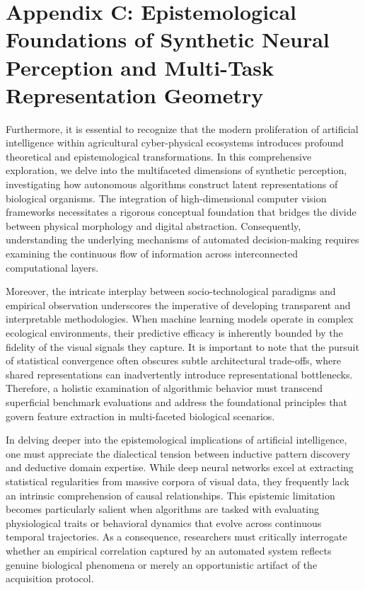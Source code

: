 \documentclass[Times,12pt,oneside,openany,print,index]{report}
\begin{document}
\chapter*{Appendix C: Epistemological Foundations of Synthetic Neural Perception and Multi-Task Representation Geometry}

Furthermore, it is essential to recognize that the modern proliferation of artificial intelligence within agricultural cyber-physical ecosystems introduces profound theoretical and epistemological transformations. In this comprehensive exploration, we delve into the multifaceted dimensions of synthetic perception, investigating how autonomous algorithms construct latent representations of biological organisms. The integration of high-dimensional computer vision frameworks necessitates a rigorous conceptual foundation that bridges the divide between physical morphology and digital abstraction. Consequently, understanding the underlying mechanisms of automated decision-making requires examining the continuous flow of information across interconnected computational layers.

Moreover, the intricate interplay between socio-technological paradigms and empirical observation underscores the imperative of developing transparent and interpretable methodologies. When machine learning models operate in complex ecological environments, their predictive efficacy is inherently bounded by the fidelity of the visual signals they capture. It is important to note that the pursuit of statistical convergence often obscures subtle architectural trade-offs, where shared representations can inadvertently introduce representational bottlenecks. Therefore, a holistic examination of algorithmic behavior must transcend superficial benchmark evaluations and address the foundational principles that govern feature extraction in multi-faceted biological scenarios.

In delving deeper into the epistemological implications of artificial intelligence, one must appreciate the dialectical tension between inductive pattern discovery and deductive domain expertise. While deep neural networks excel at extracting statistical regularities from massive corpora of visual data, they frequently lack an intrinsic comprehension of causal relationships. This epistemic limitation becomes particularly salient when algorithms are tasked with evaluating physiological traits or behavioral dynamics that evolve across continuous temporal trajectories. As a consequence, researchers must critically interrogate whether an empirical correlation captured by an automated system reflects genuine biological phenomena or merely an opportunistic artifact of the acquisition protocol.
\end{document}

